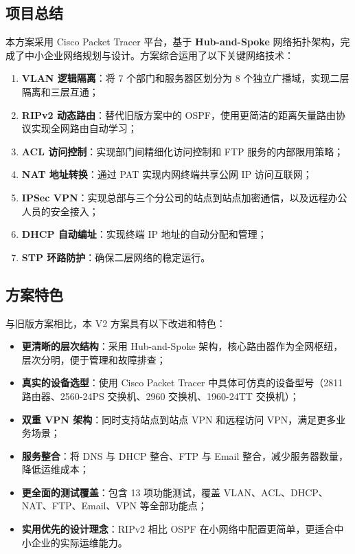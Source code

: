 \documentclass[12pt,a4paper]{ctexart}
\begin{document}
\subsection{项目总结}

本方案采用 Cisco Packet Tracer 平台，基于 \textbf{Hub-and-Spoke} 网络拓扑架构，完成了中小企业网络规划与设计。方案综合运用了以下关键网络技术：

\begin{enumerate}[label=(\arabic*), leftmargin=2em]
    \item \textbf{VLAN 逻辑隔离}：将 7 个部门和服务器区划分为 8 个独立广播域，实现二层隔离和三层互通；
    \item \textbf{RIPv2 动态路由}：替代旧版方案中的 OSPF，使用更简洁的距离矢量路由协议实现全网路由自动学习；
    \item \textbf{ACL 访问控制}：实现部门间精细化访问控制和 FTP 服务的内部限用策略；
    \item \textbf{NAT 地址转换}：通过 PAT 实现内网终端共享公网 IP 访问互联网；
    \item \textbf{IPSec VPN}：实现总部与三个分公司的站点到站点加密通信，以及远程办公人员的安全接入；
    \item \textbf{DHCP 自动编址}：实现终端 IP 地址的自动分配和管理；
    \item \textbf{STP 环路防护}：确保二层网络的稳定运行。
\end{enumerate}

\subsection{方案特色}

与旧版方案相比，本 V2 方案具有以下改进和特色：

\begin{itemize}
    \item \textbf{更清晰的层次结构}：采用 Hub-and-Spoke 架构，核心路由器作为全网枢纽，层次分明，便于管理和故障排查；
    \item \textbf{真实的设备选型}：使用 Cisco Packet Tracer 中具体可仿真的设备型号（2811 路由器、2560-24PS 交换机、2960 交换机、1960-24TT 交换机）；
    \item \textbf{双重 VPN 架构}：同时支持站点到站点 VPN 和远程访问 VPN，满足更多业务场景；
    \item \textbf{服务整合}：将 DNS 与 DHCP 整合、FTP 与 Email 整合，减少服务器数量，降低运维成本；
    \item \textbf{更全面的测试覆盖}：包含 13 项功能测试，覆盖 VLAN、ACL、DHCP、NAT、FTP、Email、VPN 等全部功能点；
    \item \textbf{实用优先的设计理念}：RIPv2 相比 OSPF 在小网络中配置更简单，更适合中小企业的实际运维能力。
\end{itemize}
\end{document}
